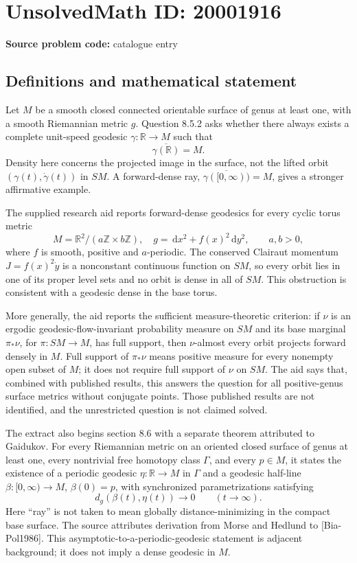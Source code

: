 \documentclass[11pt]{article}
\newcommand{\Z}{\mathbb{Z}}
\newcommand{\R}{\mathbb{R}}
\newcommand{\dd}{\,\mathrm{d}}
\begin{document}
\section*{UnsolvedMath ID: 20001916}
\textbf{Source problem code:} catalogue entry
\subsection{Definitions and mathematical statement}
Let \(M\) be a smooth closed connected orientable surface of genus at least one, with a smooth Riemannian metric \(g\). Question 8.5.2 asks whether there always exists a complete unit-speed geodesic \(\gamma:\R\to M\) such that
\[
\overline{\gamma(\R)}=M.
\]
Density here concerns the projected image in the surface, not the lifted orbit \((\gamma(t),\dot\gamma(t))\) in \(SM\). A forward-dense ray, \(\overline{\gamma([0,\infty))}=M\), gives a stronger affirmative example.

The supplied research aid reports forward-dense geodesics for every cyclic torus metric
\[
M=\R^2/(a\Z\times b\Z),\quad
g=\dd x^2+f(x)^2\dd y^2,\qquad a,b>0,
\]
where \(f\) is smooth, positive and \(a\)-periodic. The conserved Clairaut momentum \(J=f(x)^2\dot y\) is a nonconstant continuous function on \(SM\), so every orbit lies in one of its proper level sets and no orbit is dense in all of \(SM\). This obstruction is consistent with a geodesic dense in the base torus.

More generally, the aid reports the sufficient measure-theoretic criterion: if \(\nu\) is an ergodic geodesic-flow-invariant probability measure on \(SM\) and its base marginal \(\pi_*\nu\), for \(\pi:SM\to M\), has full support, then \(\nu\)-almost every orbit projects forward densely in \(M\). Full support of \(\pi_*\nu\) means positive measure for every nonempty open subset of \(M\); it does not require full support of \(\nu\) on \(SM\). The aid says that, combined with published results, this answers the question for all positive-genus surface metrics without conjugate points. Those published results are not identified, and the unrestricted question is not claimed solved.

The extract also begins section 8.6 with a separate theorem attributed to Gaidukov. For every Riemannian metric on an oriented closed surface of genus at least one, every nontrivial free homotopy class \(\Gamma\), and every \(p\in M\), it states the existence of a periodic geodesic \(\eta:\R\to M\) in \(\Gamma\) and a geodesic half-line \(\beta:[0,\infty)\to M\), \(\beta(0)=p\), with synchronized parametrizations satisfying
\[
d_g(\beta(t),\eta(t))\longrightarrow0\qquad(t\to\infty).
\]
Here ``ray'' is not taken to mean globally distance-minimizing in the compact base surface. The source attributes derivation from Morse and Hedlund to [Bia-Pol1986]. This asymptotic-to-a-periodic-geodesic statement is adjacent background; it does not imply a dense geodesic in \(M\).
\end{document}
